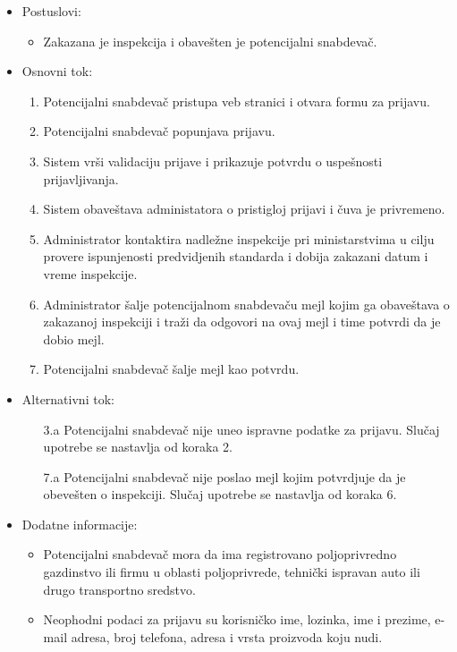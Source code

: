 \begin{itemize}
	\item Postuslovi:
		\begin{itemize}
					\item Zakazana je inspekcija i obavešten je potencijalni snabdevač.
		\end{itemize}		
	\item Osnovni tok:
		\begin{enumerate}
		    \item Potencijalni snabdevač pristupa veb stranici i otvara formu za prijavu.
		    \item Potencijalni snabdevač popunjava prijavu.
		    \item Sistem vrši validaciju prijave i prikazuje potvrdu o uspešnosti prijavljivanja.
		    \item Sistem obaveštava administatora o pristigloj prijavi i čuva je privremeno.
		    \item Administrator kontaktira nadležne inspekcije pri ministarstvima u cilju provere ispunjenosti predvidjenih standarda i dobija zakazani datum i vreme inspekcije.
		    \item Administrator šalje potencijalnom snabdevaču mejl kojim ga obaveštava o zakazanoj inspekciji i traži da odgovori na ovaj mejl i time potvrdi da je dobio mejl.
		    \item Potencijalni snabdevač šalje mejl kao potvrdu.
		\end{enumerate}
	\item Alternativni tok:
		\begin{itemize}
    		\item[3.a] Potencijalni snabdevač nije uneo ispravne podatke za prijavu. Slučaj upotrebe se nastavlja od koraka 2.
		    \item[7.a] Potencijalni snabdevač nije poslao mejl kojim potvrdjuje da je obevešten o inspekciji. Slučaj upotrebe se nastavlja od koraka 6.
		\end{itemize} 
	\item Dodatne informacije:
		\begin{itemize}
		    \item Potencijalni snabdevač mora da ima registrovano poljoprivredno gazdinstvo ili firmu u oblasti poljoprivrede, tehnički ispravan auto ili drugo transportno sredstvo.
			\item Neophodni podaci za prijavu su korisničko ime, lozinka, ime i prezime, e-mail adresa, broj telefona, adresa i vrsta proizvoda koju nudi. 
		
		\end{itemize}
						
\end{itemize}

